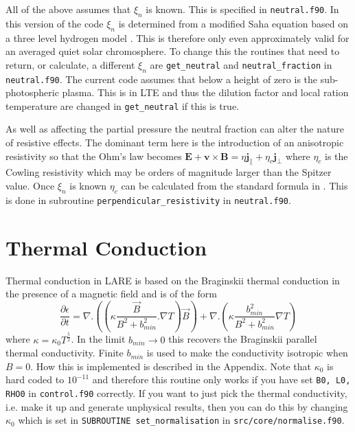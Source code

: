 \documentclass[11pt]{article}
\begin{document}
All of the above assumes that $\xi_n$ is known. This is specified in \texttt{neutral.f90}. In this version of the code $\xi_n$ is determined from a modified Saha equation based on a three level hydrogen model \cite{brown}. This is therefore only even approximately valid for an averaged quiet solar chromosphere. To change this the routines that need to return, or calculate, a different $\xi_n$ are \texttt{get\_neutral} and \texttt{neutral\_fraction} in \texttt{neutral.f90}. The current code assumes that below a height of zero is the sub-photospheric plasma. This is in LTE and thus the dilution factor and local ration temperature are changed in \texttt{get\_neutral} if this is true.

As well as affecting the partial pressure the neutral fraction can alter the nature of resistive effects. The dominant term here is the introduction of an anisotropic resistivity so that the Ohm's law becomes
$\mathbf{E}+\mathbf{v}\times\mathbf{B}=\eta \mathbf{j_{\parallel}} + \eta_c \mathbf{j_{\perp}}$
where $\eta_c$ is the Cowling resistivity which may be orders of magnitude larger than the Spitzer value. Once $\xi_n$ is known $\eta_c$ can be calculated from the standard formula in \cite{flux-emergence}. This is done in subroutine \texttt{perpendicular\_resistivity} in \texttt{neutral.f90}.

\section{Thermal Conduction} %
\label{sec:thermal_conduction}
Thermal conduction in LARE is based on the Braginskii thermal conduction in the presence of a magnetic field and is of the form\\
\[
\frac{\partial \epsilon}{\partial t} = \nabla . \left(\left(\kappa \frac{\vec{B}}{B^2+b_{min}^2}. \nabla T\right) \vec{B} \right) +  \nabla . \left(\kappa  \frac{b_{min}^2}{B^2+b_{min}^2}  \nabla T \right)
\]
where $\kappa = \kappa_0  T^\frac{5}{2}$. In the limit $b_{min}\to 0$ this recovers the Braginskii parallel thermal conductivity. Finite $b_{min}$ is used to make the conductivity isotropic when $B=0$.  How this is implemented is described in the Appendix. Note that $\kappa_0$ is hard coded to $10^{-11}$ and therefore this routine only works if you have set {\tt B0, L0, RHO0} in {\tt control.f90} correctly. If you want to just pick the thermal conductivity, i.e. make it up and generate unphysical results, then you can do this by changing $\kappa_0$ which is set in {\tt SUBROUTINE set\_normalisation} in {\tt src/core/normalise.f90}.
\end{document}
